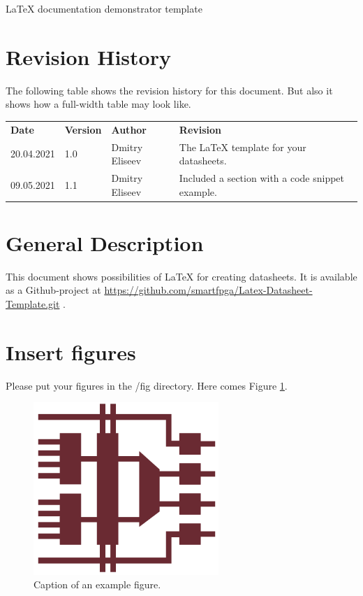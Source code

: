 \documentclass[a4paper, 10pt, onecolumn]{article}
\newcommand {\documentname}{LaTeX documentation demonstrator template}
\def\widehline{%
\noalign{\global\dimen1 \arrayrulewidth
\global\arrayrulewidth3\arrayrulewidth}%
\hline
\noalign{\global\arrayrulewidth\dimen1 }}
\newcommand{\chline}{%
    \arrayrulecolor{dimared}\widehline\arrayrulecolor{gray25}
}
\begin{document}
\thispagestyle{title}

\begin{flushleft}
\huge \documentname
\normalsize
\end{flushleft}

\section*{Revision History}
The following table shows the revision history for this document. But also it shows how a full-width table may look like.

\begin{table}[H]
\label{tab:revhist}
\centering\bgroup
\def\arraystretch{1.5}
\begin{tabularx}{\textwidth}{|l|l|l|X|}
    \hline
    \textbf{Date} & \textbf{Version} & \textbf{Author} & \textbf{Revision} \\ \chline
    20.04.2021 & 1.0 & Dmitry Eliseev & The LaTeX template for your datasheets.\\ \hline
    09.05.2021 & 1.1 & Dmitry Eliseev & Included a section with a code snippet example.\\ \hline
\end{tabularx}
\egroup
\end{table}


\section*{General Description}
This document shows possibilities of LaTeX for creating datasheets. 
It is available as a Github-project at \url{https://github.com/smartfpga/Latex-Datasheet-Template.git} \cite{GithubLink}.


\section*{Insert figures}
Please put your figures in the /fig directory. Here comes Figure \ref{fig:FigureRef}.
\begin{figure}[H]
    \begin{center}
        \includegraphics[width=7cm]{fig/SampleFigure.png}
    \end{center}
    \caption{Caption of an example figure.}
    \label{fig:FigureRef}
\end{figure}
\end{document}

